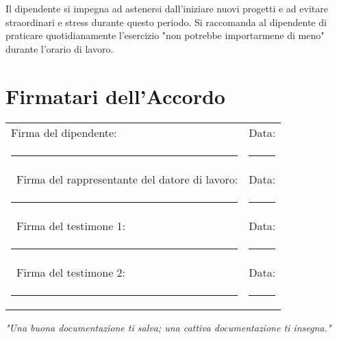 \documentclass[a4paper,11pt]{article}
\begin{document}
Il dipendente si impegna ad astenersi dall'iniziare nuovi progetti e ad evitare straordinari e stress durante questo periodo. Si raccomanda al dipendente di praticare quotidianamente l'esercizio "non potrebbe importarmene di meno" durante l'orario di lavoro.

\section*{Firmatari dell'Accordo}

\vspace{2em}
\noindent\begin{tabular}{@{}p{8cm}p{8cm}@{}}
Firma del dipendente: & Data: \\
\rule{8cm}{0.4pt} & \rule{8cm}{0.4pt} \\\
Firma del rappresentante del datore di lavoro: & Data: \\
\rule{8cm}{0.4pt} & \rule{8cm}{0.4pt} \\\
Firma del testimone 1: & Data: \\
\rule{8cm}{0.4pt} & \rule{8cm}{0.4pt} \\\
Firma del testimone 2: & Data: \\
\rule{8cm}{0.4pt} & \rule{8cm}{0.4pt}
\end{tabular}

\vfill

\begin{center}
    \textit{"Una buona documentazione ti salva; una cattiva documentazione ti insegna."}
\end{center}
\end{document}
